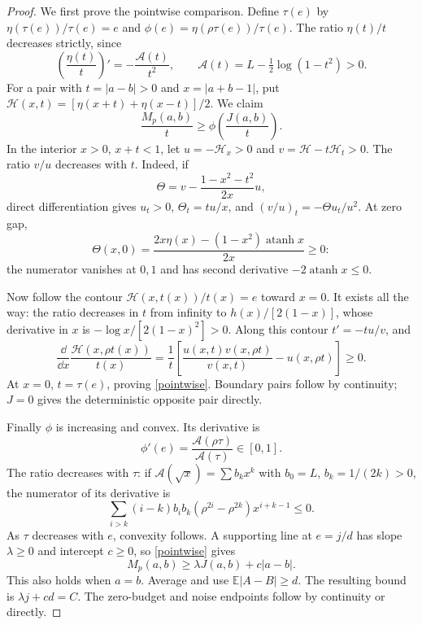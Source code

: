 \documentclass[11pt]{article}
\newcommand{\E}{\mathbb E}\newcommand{\Prb}{\mathbb P}
\newcommand{\atanh}{\operatorname{atanh}}
\numberwithin{equation}{section}
\begin{document}
\begin{proof}
We first prove the pointwise comparison. Define $\tau(e)$ by $\eta(\tau(e))/\tau(e)=e$ and
$\phi(e)=\eta(\rho\tau(e))/\tau(e)$. The ratio $\eta(t)/t$ decreases strictly, since
\begin{equation}\label{entropyratio}
 \left(\frac{\eta(t)}t\right)'=-\frac{\mathscr A(t)}{t^2},\qquad
 \mathscr A(t)=L-\tfrac12\log(1-t^2)>0.
\end{equation}
For a pair with $t=|a-b|>0$ and $x=|a+b-1|$, put
$\mathscr H(x,t)=[\eta(x+t)+\eta(x-t)]/2$. We claim
\begin{equation}\label{pointwise}
 \frac{M_p(a,b)}t\ge\phi\!\left(\frac{J(a,b)}t\right).
\end{equation}
In the interior $x>0$, $x+t<1$, let $u=-\mathscr H_x>0$ and $v=\mathscr H-t\mathscr H_t>0$. The ratio $v/u$ decreases with $t$. Indeed, if
\[
 \Theta=v-\frac{1-x^2-t^2}{2x}u,
\]
direct differentiation gives $u_t>0$, $\Theta_t=tu/x$, and $(v/u)_t=-\Theta u_t/u^2$. At zero gap,
\[
 \Theta(x,0)=\frac{2x\eta(x)-(1-x^2)\atanh x}{2x}\ge0:
\]
the numerator vanishes at $0,1$ and has second derivative $-2\atanh x\le0$.

Now follow the contour $\mathscr H(x,t(x))/t(x)=e$ toward $x=0$. It exists all the way: the ratio decreases in $t$ from infinity to $h(x)/[2(1-x)]$, whose derivative in $x$ is $-\log x/[2(1-x)^2]>0$. Along this contour $t'=-tu/v$, and
\[
 \frac{\dd}{\dd x}\frac{\mathscr H(x,\rho t(x))}{t(x)}
 =\frac1t\left[\frac{u(x,t)v(x,\rho t)}{v(x,t)}-u(x,\rho t)\right]\ge0.
\]
At $x=0$, $t=\tau(e)$, proving \eqref{pointwise}. Boundary pairs follow by continuity; $J=0$ gives the deterministic opposite pair directly.

Finally $\phi$ is increasing and convex. Its derivative is
\[
 \phi'(e)=\frac{\mathscr A(\rho\tau)}{\mathscr A(\tau)}\in[0,1].
\]
The ratio decreases with $\tau$: if $\mathscr A(\sqrt x)=\sum b_kx^k$ with $b_0=L$, $b_k=1/(2k)>0$, the numerator of its derivative is
\[
 \sum_{i>k}(i-k)b_ib_k(\rho^{2i}-\rho^{2k})x^{i+k-1}\le0.
\]
As $\tau$ decreases with $e$, convexity follows. A supporting line at $e=j/d$ has slope $\lambda\ge0$ and intercept $c\ge0$, so \eqref{pointwise} gives
\[
 M_p(a,b)\ge\lambda J(a,b)+c|a-b|.
\]
This also holds when $a=b$. Average and use $\E|A-B|\ge d$. The resulting bound is $\lambda j+cd=C$. The zero-budget and noise endpoints follow by continuity or directly.
\end{proof}
\end{document}
